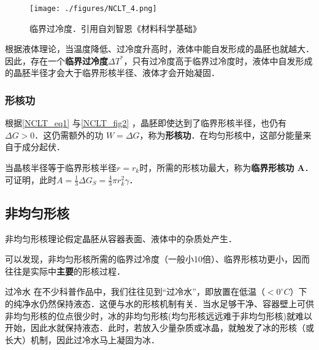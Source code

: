 \begin{figure}[ht]
\centering
\texttt{[image: ./figures/NCLT\_4.png]}
\caption{临界过冷度．引用自刘智恩《材料科学基础》} \label{NCLT_fig4}
\end{figure}
根据液体理论，当温度降低、过冷度升高时，液体中能自发形成的晶胚也就越大．因此，存在一个\textbf{临界过冷度$\Delta T^*$}，只有过冷度高于临界过冷度时，液体中自发形成的晶胚半径才会大于临界形核半径、液体才会开始凝固．

\subsubsection{形核功}
根据\autoref{NCLT_eq1} 与\autoref{NCLT_fig2} ，晶胚即使达到了临界形核半径，也仍有$\Delta G>0$．这仍需额外的功 $W=\Delta G$，称为\textbf{形核功}．在均匀形核中，这部分能量来自于成分起伏．

当晶核半径等于临界形核半径$r=r_k$时，所需的形核功最大，称为\textbf{临界形核功 A}．可证明，此时$A=\frac{1}{3}\Delta G_S=\frac{4}{3}\pi r_k^2 \gamma$．%

\subsection{非均匀形核}
非均匀形核理论假定晶胚从容器表面、液体中的杂质处产生．

可以发现，非均匀形核所需的临界过冷度（一般小10倍）、临界形核功更小，因而往往是实际中\textbf{主要}的形核过程．

\begin{example}{过冷水}
在不少科普作品中，我们往往见到“过冷水”，即放置在低温（$<0 ^\circ C$）下的纯净水仍然保持液态．这便与水的形核机制有关．当水足够干净、容器壁上可供非均匀形核的位点很少时，冰的非均匀形核(均匀形核远远难于非均匀形核)就难以开始，因此水就保持液态．此时，若放入少量杂质或冰晶，就触发了冰的形核（或长大）机制，因此过冷水马上凝固为冰．
\end{example}

